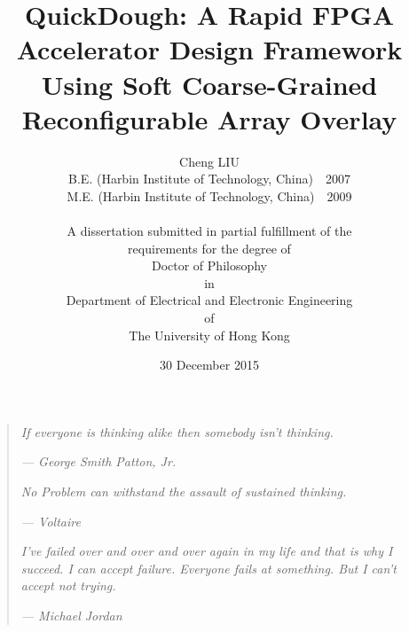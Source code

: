 \documentclass[12pt,a4paper]{report}
\begin{document}


\hfill

\title{QuickDough: A Rapid FPGA Accelerator Design 
Framework Using Soft Coarse-Grained Reconfigurable Array Overlay}

\author{Cheng LIU\\
B.E. (Harbin Institute of Technology, China)~~2007\\
M.E. (Harbin Institute of Technology, China)~~2009\\
\\
A dissertation submitted in partial fulfillment of the\\
requirements for the degree of\\
Doctor of Philosophy\\
in\\
Department of Electrical and Electronic Engineering\\
of\\
The University of Hong Kong} 

\date{30 December 2015}
\maketitle




\newpage
\section*{}

\hfill


\newpage
\begin{center}
\leavevmode
\vfill
\begin{quotation}
\textit{If everyone is thinking alike then somebody isn't thinking.}

\hfill \textsl{--- George Smith Patton, Jr.}

\vspace{1cm}

\textit{No Problem can withstand the assault of sustained thinking.}

\hfill \textsl{--- Voltaire}

\vspace{1cm}

\textit{I've failed over and over and over again in my life and that is why I succeed. I can accept failure. Everyone fails at something. But I can't accept not trying.}

\hfill \textsl{--- Michael Jordan}
\end{quotation}
\vfill
\end{center}
\end{document}
